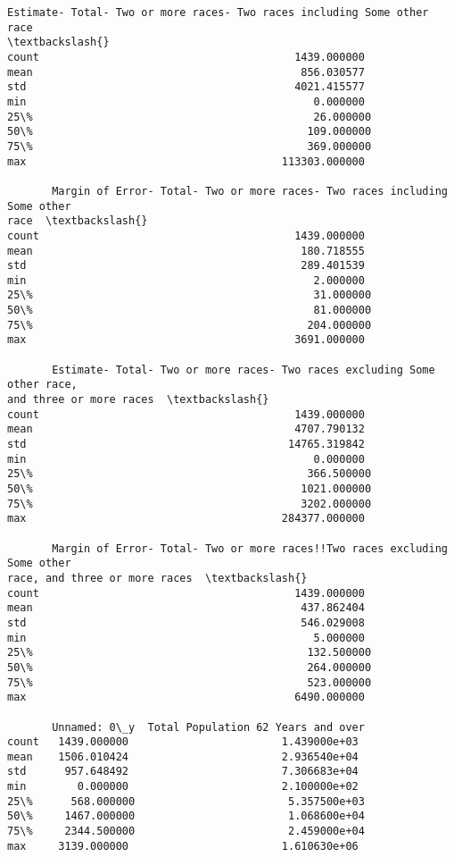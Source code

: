 \documentclass[11pt]{article}
\begin{document}
\begin{tcolorbox}[breakable, size=fbox, boxrule=.5pt, pad at break*=1mm, opacityfill=0]
\begin{Verbatim}[commandchars=\\\{\}]
       Estimate- Total- Two or more races- Two races including Some other race
\textbackslash{}
count                                        1439.000000
mean                                          856.030577
std                                          4021.415577
min                                             0.000000
25\%                                            26.000000
50\%                                           109.000000
75\%                                           369.000000
max                                        113303.000000

       Margin of Error- Total- Two or more races- Two races including Some other
race  \textbackslash{}
count                                        1439.000000
mean                                          180.718555
std                                           289.401539
min                                             2.000000
25\%                                            31.000000
50\%                                            81.000000
75\%                                           204.000000
max                                          3691.000000

       Estimate- Total- Two or more races- Two races excluding Some other race,
and three or more races  \textbackslash{}
count                                        1439.000000
mean                                         4707.790132
std                                         14765.319842
min                                             0.000000
25\%                                           366.500000
50\%                                          1021.000000
75\%                                          3202.000000
max                                        284377.000000

       Margin of Error- Total- Two or more races!!Two races excluding Some other
race, and three or more races  \textbackslash{}
count                                        1439.000000
mean                                          437.862404
std                                           546.029008
min                                             5.000000
25\%                                           132.500000
50\%                                           264.000000
75\%                                           523.000000
max                                          6490.000000

       Unnamed: 0\_y  Total Population 62 Years and over
count   1439.000000                        1.439000e+03
mean    1506.010424                        2.936540e+04
std      957.648492                        7.306683e+04
min        0.000000                        2.100000e+02
25\%      568.000000                        5.357500e+03
50\%     1467.000000                        1.068600e+04
75\%     2344.500000                        2.459000e+04
max     3139.000000                        1.610630e+06
\end{Verbatim}
\end{tcolorbox}
        
\end{document}
